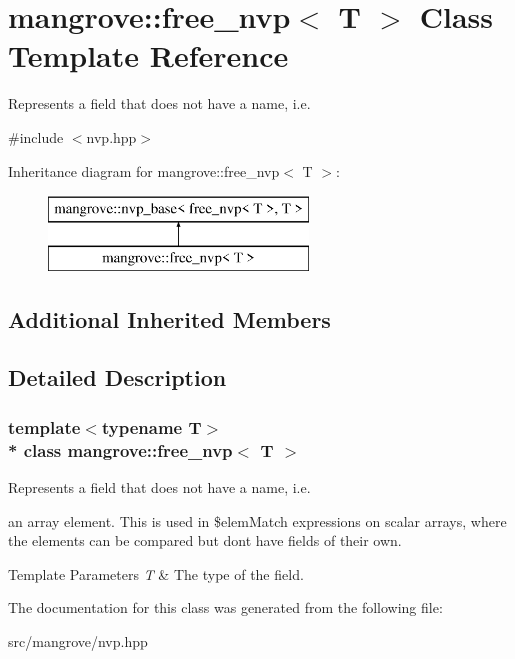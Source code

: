 \hypertarget{classmangrove_1_1free__nvp}{}\section{mangrove\+:\+:free\+\_\+nvp$<$ T $>$ Class Template Reference}
\label{classmangrove_1_1free__nvp}


Represents a field that does not have a name, i.\+e.  




{\ttfamily \#include $<$nvp.\+hpp$>$}

Inheritance diagram for mangrove\+:\+:free\+\_\+nvp$<$ T $>$\+:\begin{figure}[H]
\begin{center}
\leavevmode
\includegraphics[height=2.000000cm]{classmangrove_1_1free__nvp}
\end{center}
\end{figure}
\subsection*{Additional Inherited Members}


\subsection{Detailed Description}
\subsubsection*{template$<$typename T$>$\\*
class mangrove\+::free\+\_\+nvp$<$ T $>$}

Represents a field that does not have a name, i.\+e. 

an array element. This is used in \$elem\+Match expressions on scalar arrays, where the elements can be compared but don\textquotesingle{}t have fields of their own. 
\begin{DoxyTemplParams}{Template Parameters}
{\em T} & The type of the field. \\
\hline
\end{DoxyTemplParams}


The documentation for this class was generated from the following file\+:\begin{DoxyCompactItemize}
\item 
src/mangrove/nvp.\+hpp\end{DoxyCompactItemize}
